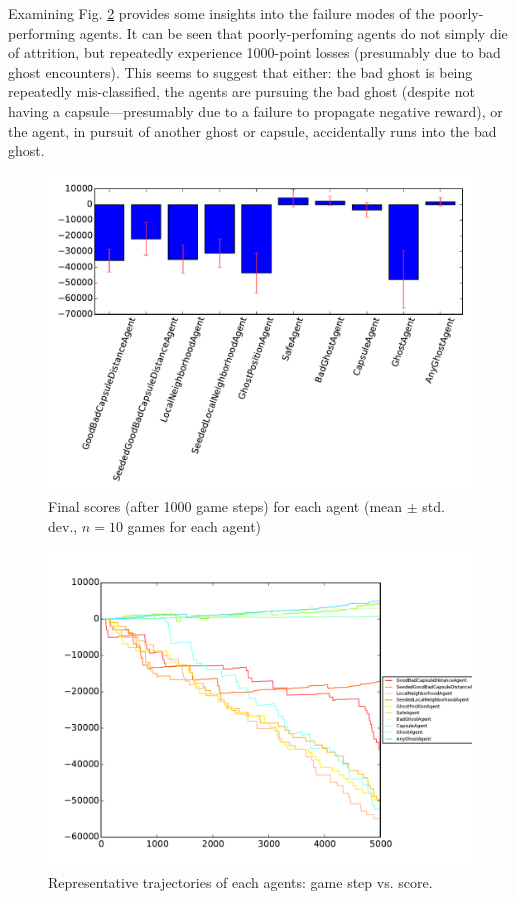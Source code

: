 \documentclass[11pt]{amsart}
\begin{document}
Examining Fig. \ref{fig:agents-trajectories} provides some insights into the failure modes of the poorly-performing agents. It can be seen that poorly-perfoming agents do not simply die of attrition, but repeatedly experience 1000-point losses (presumably due to bad ghost encounters). This seems to suggest that either: the bad ghost is being repeatedly mis-classified, the agents are pursuing the bad ghost (despite not having a capsule---presumably due to a failure to propagate negative reward), or the agent, in pursuit of another ghost or capsule, accidentally runs into the bad ghost.

\begin{figure}
	\includegraphics[width=\textwidth]{agents-finals.pdf}
	\caption{Final scores (after 1000 game steps) for each agent (mean $\pm$ std. dev., $n = 10$ games for each agent)}
	\label{fig:agents-finals}
\end{figure}

\begin{figure}
	\includegraphics[width=\textwidth]{agents-trajectories.pdf}
	\caption{Representative trajectories of each agents: game step vs. score.}
	\label{fig:agents-trajectories}
\end{figure}
\end{document}
